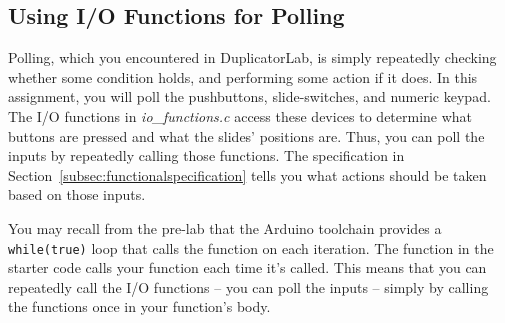 

\subsection{Using I/O Functions for Polling}

Polling, which you encountered in DuplicatorLab, is simply repeatedly checking whether some condition holds, and performing some action if it does.
In this assignment, you will poll the pushbuttons, slide-switches, and numeric keypad.
The I/O functions in \textit{io\_functions.c} access these devices to determine what buttons are pressed and what the slides' positions are.
Thus, you can poll the inputs by repeatedly calling those functions.
The specification in Section~\ref{subsec:functionalspecification} tells you what actions should be taken based on those inputs.

You may recall from the pre-lab that the Arduino toolchain provides a \lstinline{while(true)} loop that calls the  function on each iteration.
The  function in the starter code calls your  function each time it's called.
This means that you can repeatedly call the I/O functions -- you can poll the inputs -- simply by calling the functions once in your  function's body.

